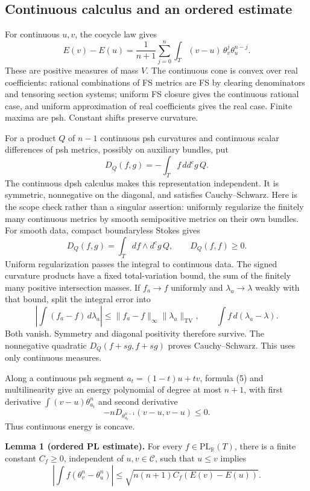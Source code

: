 \documentclass[
]{article}
\begin{document}
\subsection{Continuous calculus and an ordered
estimate}\label{continuous-calculus-and-an-ordered-estimate}

For continuous \(u,v\), the cocycle law gives \[
E(v)-E(u)=\frac1{n+1}\sum_{j=0}^n\int_T(v-u)\,\theta_v^j\theta_u^{n-j}.
\tag{5}
\] These are positive measures of mass \(V\). The continuous cone is
convex over real coefficients: rational combinations of FS metrics are
FS by clearing denominators and tensoring section systems; uniform FS
closure gives the continuous rational case, and uniform approximation of
real coefficients gives the real case. Finite maxima are psh. Constant
shifts preserve curvature.

For a product \(Q\) of \(n-1\) continuous psh curvatures and continuous
scalar differences of psh metrics, possibly on auxiliary bundles, put \[
D_Q(f,g)=-\int_T f\,dd^cg\,Q.
\tag{6}
\] The continuous dpsh calculus makes this representation independent.
It is symmetric, nonnegative on the diagonal, and satisfies
Cauchy--Schwarz. Here is the scope check rather than a singular
assertion: uniformly regularize the finitely many continuous metrics by
smooth semipositive metrics on their own bundles. For smooth data,
compact boundaryless Stokes gives \[
D_Q(f,g)=\int_Tdf\wedge d^cg\,Q,\qquad D_Q(f,f)\geq0.
\] Uniform regularization passes the integral to continuous data. The
signed curvature products have a fixed total-variation bound, the sum of
the finitely many positive intersection masses. If \(f_a\to f\)
uniformly and \(\lambda_a\to\lambda\) weakly with that bound, split the
integral error into \[
\left|\int(f_a-f)\,d\lambda_a\right|\leq\|f_a-f\|_\infty\|\lambda_a\|_{\mathrm{TV}},\qquad
\int f\,d(\lambda_a-\lambda).
\] Both vanish. Symmetry and diagonal positivity therefore survive. The
nonnegative quadratic \(D_Q(f+sg,f+sg)\) proves Cauchy--Schwarz. This
uses only continuous measures.

Along a continuous psh segment \(a_t=(1-t)u+tv\), formula (5) and
multilinearity give an energy polynomial of degree at most \(n+1\), with
first derivative \(\int(v-u)\theta_{a_t}^n\) and second derivative \[
-nD_{\theta_{a_t}^{n-1}}(v-u,v-u)\leq0.
\] Thus continuous energy is concave.

\textbf{Lemma 1 (ordered PL estimate).} For every
\(f\in\mathrm{PL}_{\mathbb R}(T)\), there is a finite constant
\(C_f\geq0\), independent of \(u,v\in\mathcal C\), such that \(u\leq v\)
implies \[
\left|\int f(\theta_v^n-\theta_u^n)\right|
\leq\sqrt{n(n+1)C_f(E(v)-E(u))}.
\tag{7}
\]
\end{document}
